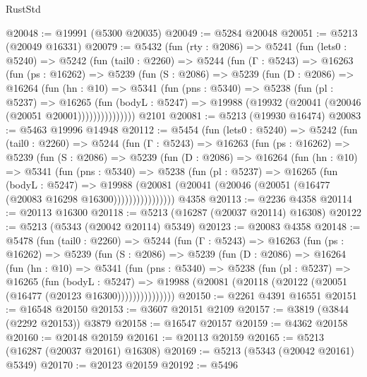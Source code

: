 \begin{lexlean}{RustStd}
\begin{coremodule}
@20048 := @19991 (@5300 @20035)
@20049 := @5284 @20048
@20051 := @5213 (@20049 @16331)
@20079 := @5432
    (fun (rty : @2086) =>
    @5241
      (fun (lets0 : @5240) =>
      @5242
        (fun (tail0 : @2260) =>
        @5244
          (fun (Γ : @5243) =>
          @16263
            (fun (ps : @16262) =>
            @5239
              (fun (S : @2086) =>
              @5239
                (fun (D : @2086) =>
                @16264
                  (fun (hn : @10) =>
                  @5341
                    (fun (pns : @5340) =>
                    @5238
                      (fun (pl : @5237) =>
                      @16265
                        (fun (bodyL : @5247) =>
                        @19988 (@19932 (@20041 (@20046 (@20051 @20001)))))))))))))))
    @2101
@20081 := @5213 (@19930 @16474)
@20083 := @5463 @19996 @14948
@20112 := @5454
    (fun (lets0 : @5240) =>
    @5242
      (fun (tail0 : @2260) =>
      @5244
        (fun (Γ : @5243) =>
        @16263
          (fun (ps : @16262) =>
          @5239
            (fun (S : @2086) =>
            @5239
              (fun (D : @2086) =>
              @16264
                (fun (hn : @10) =>
                @5341
                  (fun (pns : @5340) =>
                  @5238
                    (fun (pl : @5237) =>
                    @16265
                      (fun (bodyL : @5247) =>
                      @19988
                        (@20081
                          (@20041 (@20046 (@20051 (@16477 (@20083 @16298 @16300))))))))))))))))
    @4358
@20113 := @2236 @4358
@20114 := @20113 @16300
@20118 := @5213 (@16287 (@20037 @20114) @16308)
@20122 := @5213 (@5343 (@20042 @20114) @5349)
@20123 := @20083 @4358
@20148 := @5478
    (fun (tail0 : @2260) =>
    @5244
      (fun (Γ : @5243) =>
      @16263
        (fun (ps : @16262) =>
        @5239
          (fun (S : @2086) =>
          @5239
            (fun (D : @2086) =>
            @16264
              (fun (hn : @10) =>
              @5341
                (fun (pns : @5340) =>
                @5238
                  (fun (pl : @5237) =>
                  @16265
                    (fun (bodyL : @5247) =>
                    @19988 (@20081 (@20118 (@20122 (@20051 (@16477 (@20123 @16300)))))))))))))))
@20150 := @2261 @4391 @16551
@20151 := @16548 @20150
@20153 := @3607 @20151 @2109
@20157 := @3819 (@3844 (@2292 @20153)) @3879
@20158 := @16547 @20157
@20159 := @4362 @20158
@20160 := @20148 @20159
@20161 := @20113 @20159
@20165 := @5213 (@16287 (@20037 @20161) @16308)
@20169 := @5213 (@5343 (@20042 @20161) @5349)
@20170 := @20123 @20159
@20192 := @5496

\end{coremodule}
\end{lexlean}
